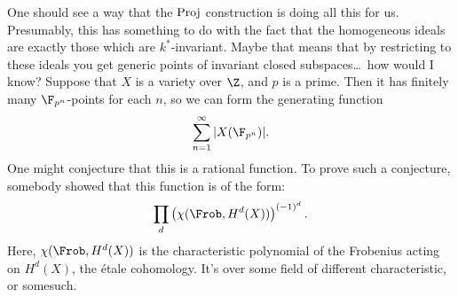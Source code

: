 \documentclass[11pt]{article}
\begin{document}
One should see a way that the $\operatorname{Proj}$ construction is doing all this for us.
Presumably, this has something to do with the fact that the homogeneous ideals
are exactly those which are $k^*$-invariant. Maybe that means that by restricting to these ideals you get generic points of invariant closed subspaces\ldots\ how would I know?
Suppose that $X$ is a variety over $\Z$, and $p$ is a prime. Then it has
finitely many $\F_{p^n}$-points for each $n$, so we can form the generating
function
\[\sum_{n=1}^\infty|X(\F_{p^n})|.\]
One might conjecture that this is a rational function. To prove such a conjecture, somebody showed that this function is of the form:
\[\prod_{d}\left(\chi(\Frob,H^d(X))\right)^{(-1)^d}.\]
Here, $\chi(\Frob,H^d(X))$ is the characteristic polynomial of the Frobenius
acting on $H^d(X)$, the \'etale cohomology. It's over some field of different
characteristic, or somesuch.
\end{document}
